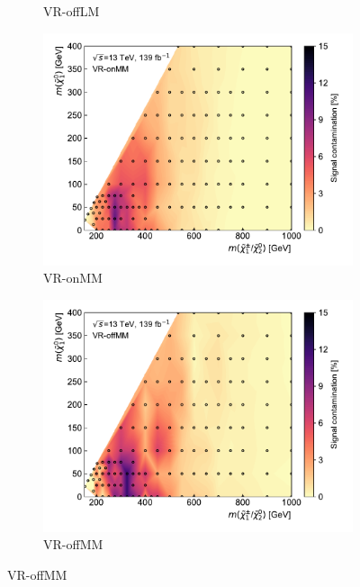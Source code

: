\begin{figure}[H]
\begin{subfigure}[b]{0.5\linewidth}
		\caption{VR-offLM\label{fig:signal_contamination_VRoff1}}
	\end{subfigure}\hfill
	\par\medskip
	\begin{subfigure}[b]{0.5\linewidth}
		\centering\includegraphics[width=1.0\textwidth]{signal_contamination/plot_VR_onMM}
		\caption{VR-onMM\label{fig:signal_contamination_VRon2}}
	\end{subfigure}\hfill
	\begin{subfigure}[b]{0.5\linewidth}
		\centering\includegraphics[width=1.0\textwidth]{signal_contamination/plot_VR_offMM}
		\caption{VR-offMM\label{fig:signal_contamination_VRoff2}}
	\end{subfigure}\hfill

\end{figure}

